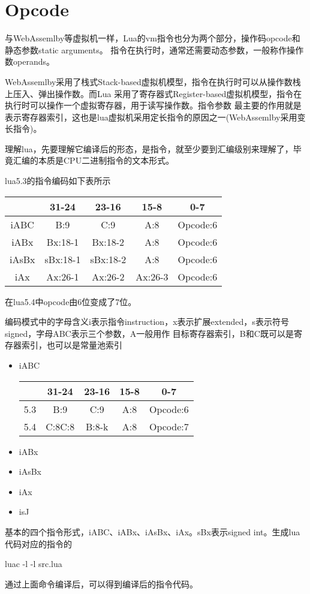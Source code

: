\chapter{Opcode}

与WebAssemlby等虚拟机一样，Lua的vm指令也分为两个部分，操作码opcode和静态参数static arguments。
指令在执行时，通常还需要动态参数，一般称作操作数operands。

WebAssemlby采用了栈式Stack-based虚拟机模型，指令在执行时可以从操作数栈上压入、弹出操作数。而Lua
采用了寄存器式Register-based虚拟机模型，指令在执行时可以操作一个虚拟寄存器，用于读写操作数。指令参数
最主要的作用就是表示寄存器索引，这也是lua虚拟机采用定长指令的原因之一(WebAssemlby采用变长指令)。

理解lua，先要理解它编译后的形态，是指令，就至少要到汇编级别来理解了，毕竟汇编的本质是CPU二进制指令的文本形式。

lua5.3的指令编码如下表所示
\begin{center}
    \begin{tabular}{|c|c|c|c|c|} \hline
       \hbox{} & \hbox{31-24} & \hbox{23-16} & \hbox{15-8} & \hbox{0-7} \\ \hline
       \hbox{iABC} & \hbox{B:9} & \hbox{C:9} & \hbox{A:8}  & \hbox{Opcode:6} \\ \hline
       \hbox{iABx} & \hbox{Bx:18-1} & \hbox{Bx:18-2} & \hbox{A:8}  & \hbox{Opcode:6} \\ \hline
       \hbox{iAsBx} & \hbox{sBx:18-1} & \hbox{sBx:18-2} & \hbox{A:8}  & \hbox{Opcode:6} \\ \hline
       \hbox{iAx} & \hbox{Ax:26-1} & \hbox{Ax:26-2} & \hbox{Ax:26-3}  & \hbox{Opcode:6} \\ \hline
    \end{tabular}
\end{center}
在lua5.4中opcode由6位变成了7位。

编码模式中的字母含义i表示指令instruction，x表示扩展extended，s表示符号signed，字母ABC表示三个参数，A一般用作
目标寄存器索引，B和C既可以是寄存器索引，也可以是常量池索引

\begin{itemize}
    \item {iABC
    \begin{center}
        \begin{tabular}{|c|c|c|c|c|} \hline
           \hbox{} & \hbox{31-24} & \hbox{23-16} & \hbox{15-8} & \hbox{0-7} \\ \hline
           \hbox{5.3} & \hbox{B:9} & \hbox{C:9} & \hbox{A:8}  & \hbox{Opcode:6} \\ \hline
           \hbox{5.4} & \hbox{C:8C:8} & \hbox{B:8-k} & \hbox{A:8}  & \hbox{Opcode:7} \\ \hline
        \end{tabular}
    \end{center}
    }
    \item {iABx}
    \item {iAsBx}
    \item {iAx}
    \item {isJ}
\end{itemize}

基本的四个指令形式，iABC、iABx、iAsBx、iAx。sBx表示signed int。生成lua代码对应的指令的

luac -l -l src.lua

通过上面命令编译后，可以得到编译后的指令代码。
